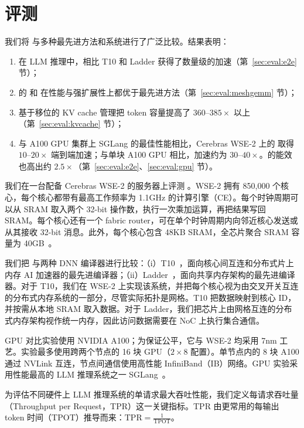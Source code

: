 \vspace{-0.3cm}
\section{评测}
\vspace{-0.2cm}

我们将 \sys 与多种最先进方法和系统进行了广泛比较。结果表明：
\begin{enumerate}[label=(\arabic*),leftmargin=0.5cm,noitemsep,topsep=0pt]
\item 在 LLM 推理中，\sys 相比 T10 和 Ladder 获得了数量级的加速（第~\ref{sec:eval:e2e} 节）；
\item \sys 的 \gemm 和 \gemv 在性能与强扩展性上都优于最先进方法（第~\ref{sec:eval:meshgemm} 节）；
\item \sys 基于移位的 KV cache 管理把 token 容量提高了 $360$--$385\times$ 以上（第~\ref{sec:eval:kvcache} 节）；
\item 与 A100 GPU 集群上 SGLang 的最佳性能相比，Cerebras WSE-2 上的 \sys 取得 $10$--$20\times$ 端到端加速；与单块 A100 GPU 相比，加速约为 $30$--$40\times$。\sys 的能效也高出约 $2.5\times$（第~\ref{sec:eval:e2e}、\ref{sec:eval:gpu} 节）。
\end{enumerate}

我们在一台配备 Cerebras WSE-2 的服务器上评测 \sys。WSE-2 拥有 850,000 个核心，每个核心都带有最高工作频率为 1.1GHz 的计算引擎（CE）。每个时钟周期可以从 SRAM 取入两个 32-bit 操作数，执行一次乘加运算，再把结果写回 SRAM。每个核心还有一个 fabric router，可在单个时钟周期内向邻近核心发送或从其接收 32-bit 消息。此外，每个核心包含 48KB SRAM，全芯片聚合 SRAM 容量为 40GB~\cite{wse}。

我们把 \sys 与两种 DNN 编译器进行比较：（i）T10~\cite{t10}，面向核心间互连和分布式片上内存 AI 加速器的最先进编译器；（ii）Ladder~\cite{ladder}，面向共享内存架构的最先进编译器。对于 T10，我们在 WSE-2 上实现该系统，并把每个核心视为由交叉开关互连的分布式内存系统的一部分，尽管实际拓扑是网格。T10 把数据映射到核心 ID，并按需从本地 SRAM 取入数据。对于 Ladder，我们把芯片上由网格互连的分布式内存架构视作统一内存，因此访问数据需要在 NoC 上执行集合通信。

GPU 对比实验使用 NVIDIA A100；为保证公平，它与 WSE-2 均采用 7nm 工艺。实验最多使用跨两个节点的 16 块 GPU（$2\times8$ 配置）。单节点内的 8 块 A100 通过 NVLink 互连，节点间通信使用高性能 InfiniBand（IB）网络。GPU 实验采用性能最高的 LLM 推理系统之一 SGLang~\cite{sglang}。

 为评估不同硬件上 LLM 推理系统的单请求最大吞吐性能，我们定义每请求吞吐量（Throughput per Request，TPR）这一关键指标。TPR 由更常用的每输出 token 时间（TPOT）推导而来：$\text{TPR}=\frac{1}{\text{TPOT}}$。


